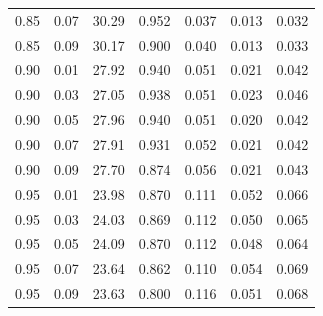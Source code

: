 \begin{table}[htbp]
\begin{tabular}{ccccccc}
0.85 & 0.07 & 30.29 & 0.952 & 0.037 & 0.013 & 0.032 \\
0.85 & 0.09 & 30.17 & 0.900 & 0.040 & 0.013 & 0.033 \\
0.90 & 0.01 & 27.92 & 0.940 & 0.051 & 0.021 & 0.042 \\
0.90 & 0.03 & 27.05 & 0.938 & 0.051 & 0.023 & 0.046 \\
0.90 & 0.05 & 27.96 & 0.940 & 0.051 & 0.020 & 0.042 \\
0.90 & 0.07 & 27.91 & 0.931 & 0.052 & 0.021 & 0.042 \\
0.90 & 0.09 & 27.70 & 0.874 & 0.056 & 0.021 & 0.043 \\
0.95 & 0.01 & 23.98 & 0.870 & 0.111 & 0.052 & 0.066 \\
0.95 & 0.03 & 24.03 & 0.869 & 0.112 & 0.050 & 0.065 \\
0.95 & 0.05 & 24.09 & 0.870 & 0.112 & 0.048 & 0.064 \\
0.95 & 0.07 & 23.64 & 0.862 & 0.110 & 0.054 & 0.069 \\
0.95 & 0.09 & 23.63 & 0.800 & 0.116 & 0.051 & 0.068 \\
\bottomrule
\end{tabular}
\end{table}

